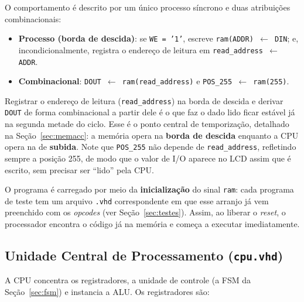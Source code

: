 \documentclass[12pt,a4paper]{article}
\begin{document}
O comportamento é descrito por um único processo síncrono e duas atribuições combinacionais:

\begin{itemize}
    \item \textbf{Processo (borda de descida)}: se \texttt{WE = '1'}, escreve
          \texttt{ram(ADDR) $\leftarrow$ DIN}; e, incondicionalmente, registra o endereço de
          leitura em \texttt{read\_address $\leftarrow$ ADDR}.
    \item \textbf{Combinacional}: \texttt{DOUT $\leftarrow$ ram(read\_address)} e
          \texttt{POS\_255 $\leftarrow$ ram(255)}.
\end{itemize}

Registrar o endereço de leitura (\texttt{read\_address}) na borda de descida e derivar
\texttt{DOUT} de forma combinacional a partir dele é o que faz o dado lido ficar estável já
na segunda metade do ciclo. Esse é o ponto central de temporização, detalhado na
Seção~\ref{sec:memacc}: a memória opera na \textbf{borda de descida} enquanto a CPU opera na
de \textbf{subida}. Note que \texttt{POS\_255} não depende de \texttt{read\_address},
refletindo sempre a posição 255, de modo que o valor de I/O aparece no LCD assim que é
escrito, sem precisar ser ``lido'' pela CPU.

O programa é carregado por meio da \textbf{inicialização} do sinal \texttt{ram}: cada
programa de teste tem um arquivo \texttt{.vhd} correspondente em que esse arranjo já vem
preenchido com os \textit{opcodes} (ver Seção~\ref{sec:testes}). Assim, ao liberar o
\textit{reset}, o processador encontra o código já na memória e começa a executar
imediatamente.

\subsection{Unidade Central de Processamento (\texttt{cpu.vhd})}

A CPU concentra os registradores, a unidade de controle (a FSM da Seção~\ref{sec:fsm}) e
instancia a ALU. Os registradores são:
\end{document}
